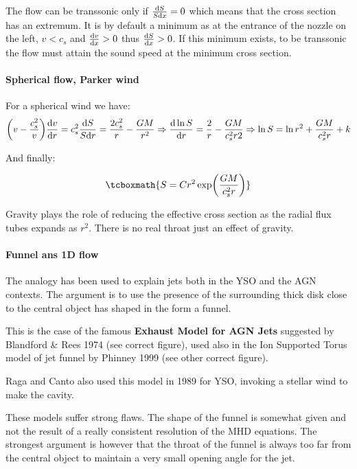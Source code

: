 \documentclass[10pt,a4paper,english]{article}
\let\originalleft\left
\let\originalright\right
\renewcommand{\left}{\mathopen{}\mathclose\bgroup\originalleft}
\renewcommand{\right}{\aftergroup\egroup\originalright}
\begin{document}
The flow can be transsonic only if $\frac{\mathrm{d} S}{S\mathrm{d} x} = 0 $ which
means that the cross section has an extremum. It is by default a
minimum as at the entrance of the nozzle on the left, $v<c_s$ and
$\frac{\mathrm{d} v}{\mathrm{d} x} > 0$ thus $\frac{\mathrm{d} S}{\mathrm{d} x} > 0 $. If this minimum
exists, to be transsonic the flow must attain the sound speed at the
minimum cross section.

\paragraph{Spherical flow, Parker wind}

For a spherical wind we have:
\begin{equation}
  \left( v - \frac{c_s^2}{v}  \right)\frac{\d v}{\d r} = c_s^2\frac{\d S}{S\d r}
  = \frac{2c_s^2}{r} - \frac{GM}{r^2} \Rightarrow \frac{\d \ln S}{\d r} =
  \frac{2}{r} - \frac{GM}{c_s^2 r2}
  \Rightarrow \ln S = \ln r^2 +\frac{GM}{c_s^2r} + k
\end{equation}

And finally:

\begin{equation}
  \tcboxmath{S = Cr^2 \exp\left(\frac{GM}{c_s^2 r}\right)}
\end{equation}

Gravity plays the role of reducing the effective cross section as the
radial flux tubes expands as $r^2$. There is no real throat just an
effect of gravity.

\paragraph{Funnel ans 1D flow}
The analogy has been used to explain jets both in the YSO and the AGN
contexts. The argument is to use the presence of the surrounding thick
disk close to the central object has shaped in the form a funnel.

This is the case of the famous \textbf{ Exhaust Model for AGN Jets}
suggested by Blandford \& Rees 1974 (see correct figure), used also in
the Ion Supported Torus model of jet funnel by Phinney 1999 (see other
correct figure).


Raga and Canto also used this model in 1989 for YSO, invoking a
stellar wind to make the cavity.


These models suffer strong flaws. The shape of the funnel is somewhat
given and not the result of a really consistent resolution of the MHD
equations. The strongest argument is however that the throat of the
funnel is always too far from the central object to maintain a very
small opening angle for the jet.
\end{document}
